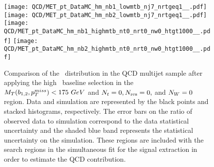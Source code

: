 \begin{figure}[!h]
	\begin{center}
  \texttt{[image: QCD/MET\_pt\_DataMC\_hm\_nb1\_lowmtb\_nj7\_nrtgeq1\_\_.pdf]}
  \texttt{[image: QCD/MET\_pt\_DataMC\_hm\_nb2\_lowmtb\_nj7\_nrtgeq1\_\_.pdf]} \\
  \texttt{[image: QCD/MET\_pt\_DataMC\_hm\_nb1\_highmtb\_nt0\_nrt0\_nw0\_htgt1000\_\_.pdf]}
  \texttt{[image: QCD/MET\_pt\_DataMC\_hm\_nb2\_highmtb\_nt0\_nrt0\_nw0\_htgt1000\_\_.pdf]} \\
	\end{center}
	\caption[QCD Multijet HM Control Region]{Comparison of the \met~distribution in the QCD multijet sample after applying the high \dm~baseline selection in the $M_{T}(b_{1,2},p_{T}^{miss})<175~GeV$ and $N_{t}=0, N_{\text{res}}=0,$ and $N_{W}=0$ region. Data and simulation are represented by the black points and stacked histograms, respectively. The error bars on the ratio of observed data to simulation correspond to the data statistical uncertainty and the shaded blue band represents the statistical uncertainty on the simulation. These regions are included with the search regions in the simultaneous fit for the signal extraction in order to estimate the QCD contribution.
	 }
	\label{fig:qcd-cr-datavsmc-hm-nt0-nrt0-nw0}
\end{figure}

